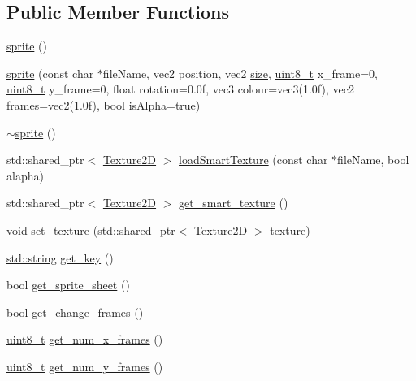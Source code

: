 \subsection*{Public Member Functions}
\begin{DoxyCompactItemize}
\item 
\hyperlink{classsprite_ab301a52437b1fedba953a3a3003d3a0d}{sprite} ()
\item 
\hyperlink{classsprite_a4eb7fd55561401ee6765aae2ff18433d}{sprite} (const char $\ast$file\+Name, vec2 position, vec2 \hyperlink{imgui__impl__opengl3__loader_8h_a3d1e3edfcf61ca2d831883e1afbad89e}{size}, \hyperlink{stdint_8h_aba7bc1797add20fe3efdf37ced1182c5}{uint8\+\_\+t} x\+\_\+frame=0, \hyperlink{stdint_8h_aba7bc1797add20fe3efdf37ced1182c5}{uint8\+\_\+t} y\+\_\+frame=0, float rotation=0.\+0f, vec3 colour=vec3(1.\+0f), vec2 frames=vec2(1.\+0f), bool is\+Alpha=true)
\item 
\hyperlink{classsprite_aa2c57852113368003657c673e39b6f3a}{$\sim$sprite} ()
\item 
std\+::shared\+\_\+ptr$<$ \hyperlink{classTexture2D}{Texture2D} $>$ \hyperlink{classsprite_afe48450fff6269737f6adf370d03bbd8}{load\+Smart\+Texture} (const char $\ast$file\+Name, bool alapha)
\item 
std\+::shared\+\_\+ptr$<$ \hyperlink{classTexture2D}{Texture2D} $>$ \hyperlink{classsprite_a85a220f38cdb533f79f888d2b5911e4c}{get\+\_\+smart\+\_\+texture} ()
\item 
\hyperlink{imgui__impl__opengl3__loader_8h_ac668e7cffd9e2e9cfee428b9b2f34fa7}{void} \hyperlink{classsprite_a9923b8aa539e4a415a105df2e5ef723e}{set\+\_\+texture} (std\+::shared\+\_\+ptr$<$ \hyperlink{classTexture2D}{Texture2D} $>$ \hyperlink{imgui__impl__opengl3__loader_8h_a0b57774cb59b667df4a205ae0b1a50e2}{texture})
\item 
\hyperlink{imgui__impl__opengl3__loader_8h_ac83513893df92266f79a515488701770}{std\+::string} \hyperlink{classsprite_a5626c49182e9785cab088ec140cc95e2}{get\+\_\+key} ()
\item 
bool \hyperlink{classsprite_a6b2f3ae0858b040330d66a547543d91e}{get\+\_\+sprite\+\_\+sheet} ()
\item 
bool \hyperlink{classsprite_a935dcb319f155f0fcb698e2c082e3f2c}{get\+\_\+change\+\_\+frames} ()
\item 
\hyperlink{stdint_8h_aba7bc1797add20fe3efdf37ced1182c5}{uint8\+\_\+t} \hyperlink{classsprite_a437200beac1a88ed9a35a1dc2e190e93}{get\+\_\+num\+\_\+x\+\_\+frames} ()
\item 
\hyperlink{stdint_8h_aba7bc1797add20fe3efdf37ced1182c5}{uint8\+\_\+t} \hyperlink{classsprite_aff2cdf45b432e65094d8113a6d9e44eb}{get\+\_\+num\+\_\+y\+\_\+frames} ()

\end{DoxyCompactItemize}
